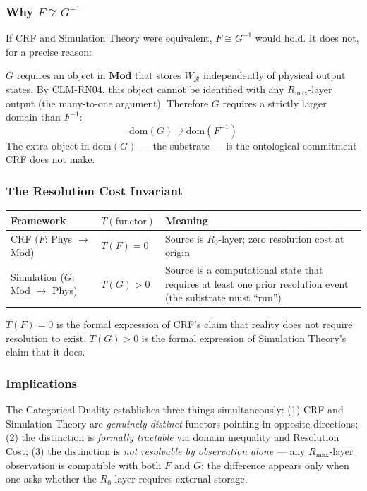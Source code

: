 \documentclass[12pt, a4paper]{article}
\begin{document}
\subsubsection{Why $F \not\cong G^{-1}$}

If CRF and Simulation Theory were equivalent, $F \cong G^{-1}$
would hold. It does not, for a precise reason:

$G$ requires an object in $\mathbf{Mod}$ that stores
$W_{\mathcal{R}}$ independently of physical output states. By
CLM-RN04, this object cannot be identified with any
$R_{\max}$-layer output (the many-to-one argument). Therefore
$G$ requires a strictly larger domain than $F^{-1}$:
\[
\mathrm{dom}(G) \supsetneq \mathrm{dom}(F^{-1})
\]
The extra object in $\mathrm{dom}(G)$ --- the substrate ---
is the ontological commitment CRF does not make.

\subsubsection{The Resolution Cost Invariant}

\begin{center}
\renewcommand{\arraystretch}{1.35}
{\small
\begin{tabular}{p{3.5cm} p{3.5cm} p{5.0cm}}
\toprule
\textbf{Framework} & $T(\text{functor})$ &
\textbf{Meaning}\\
\midrule
CRF ($F$: Phys $\to$ Mod) &
$T(F) = 0$ &
Source is $R_0$-layer; zero resolution cost at origin\\
Simulation ($G$: Mod $\to$ Phys) &
$T(G) > 0$ &
Source is a computational state that requires at least
one prior resolution event (the substrate must ``run'')\\
\bottomrule
\end{tabular}
}
\end{center}

$T(F) = 0$ is the formal expression of CRF's claim that reality
does not require resolution to exist. $T(G) > 0$ is the formal
expression of Simulation Theory's claim that it does.

\subsubsection{Implications}

The Categorical Duality establishes three things simultaneously:
(1) CRF and Simulation Theory are \emph{genuinely distinct} functors
pointing in opposite directions; (2) the distinction is
\emph{formally tractable} via domain inequality and Resolution Cost;
(3) the distinction is \emph{not resolvable by observation alone} ---
any $R_{\max}$-layer observation is compatible with both $F$ and $G$;
the difference appears only when one asks whether the $R_0$-layer
requires external storage.
\end{document}

